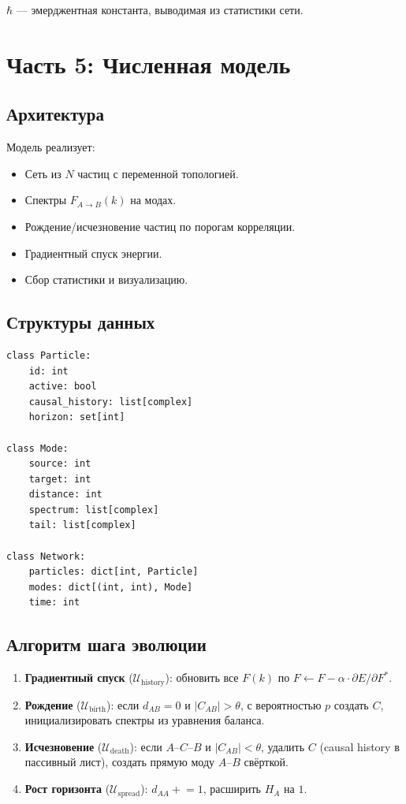 \documentclass[11pt,a4paper]{article}
\theoremstyle{definition}
\begin{document}
$\hbar$ --- эмерджентная константа, выводимая из статистики сети.

\newpage
\section{Часть 5: Численная модель}

\subsection{Архитектура}

Модель реализует:
\begin{itemize}
    \item Сеть из $N$ частиц с переменной топологией.
    \item Спектры $F_{A \to B}(k)$ на модах.
    \item Рождение/исчезновение частиц по порогам корреляции.
    \item Градиентный спуск энергии.
    \item Сбор статистики и визуализацию.
\end{itemize}

\subsection{Структуры данных}

\begin{verbatim}
class Particle:
    id: int
    active: bool
    causal_history: list[complex]
    horizon: set[int]

class Mode:
    source: int
    target: int
    distance: int
    spectrum: list[complex]
    tail: list[complex]

class Network:
    particles: dict[int, Particle]
    modes: dict[(int, int), Mode]
    time: int
\end{verbatim}

\subsection{Алгоритм шага эволюции}

\begin{enumerate}
    \item \textbf{Градиентный спуск} ($\mathcal{U}_{\text{history}}$): обновить все $F(k)$ по $F \leftarrow F - \alpha \cdot \partial E/\partial F^*$.
    \item \textbf{Рождение} ($\mathcal{U}_{\text{birth}}$): если $d_{AB} = 0$ и $|C_{AB}| > \theta$, с вероятностью $p$ создать $C$, инициализировать спектры из уравнения баланса.
    \item \textbf{Исчезновение} ($\mathcal{U}_{\text{death}}$): если $A$--$C$--$B$ и $|C_{AB}| < \theta$, удалить $C$ (causal history в пассивный лист), создать прямую моду $A$--$B$ свёрткой.
    \item \textbf{Рост горизонта} ($\mathcal{U}_{\text{spread}}$): $d_{AA} \mathrel{+}= 1$, расширить $H_A$ на $1$.
\end{enumerate}
\end{document}
